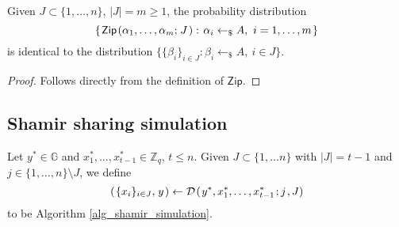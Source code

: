 \documentclass{iacrtrans}
\begin{document}
\begin{lemma}\label{zip_lemma}
Given $J \subset \{1, \dots, n\}$, $|J| = m \ge 1$,
the probability distribution
\vspace{5pt}
\begin{equation*}
\{\hspace{1pt}
\mathsf{Zip}\hspace{1pt}(
\alpha_1, \dots, \alpha_m;\hspace{1pt} J\hspace{1pt}):
\hspace{1pt}\alpha_i \leftarrow_\$ A,
\ i = 1, \dots, m
\hspace{1pt}\}
\vspace{5pt}
\end{equation*}
is identical to the distribution
$\{\{\beta_i\}_{i \in J}: \beta_i \leftarrow_\$ A,\ i \in J\}$.
\end{lemma}

\begin{proof}
Follows directly from the definition of $\mathsf{Zip}$.
\end{proof}

\subsection{Shamir sharing simulation}\label{section_shamir_sharing_simulation}

Let $y^* \in \mathbb{G}$ and
$x_1^*, \dots, x_{t-1}^* \in \mathbb{Z}_q$, $t \le n$.
Given $J \subset \{1, \dots n\}$ with $|J| = t-1$
and $j \in \{1, \dots, n\} \setminus J$,
we define
\vspace{5pt}
\begin{equation}\label{shamir_embedding_ref}
(\hspace{1pt}\{x_i\}_{i \in J},\hspace{1pt} y\hspace{1pt})
\leftarrow
\mathcal{D}\hspace{1pt}(
	\hspace{1pt}y^*,
	x_1^*, \dots, x_{t-1}^*
	\hspace{1pt};
	j\hspace{1pt},
	J
)
\vspace{0pt}
\end{equation}
to be Algorithm \ref{alg_shamir_simulation}.
\end{document}

